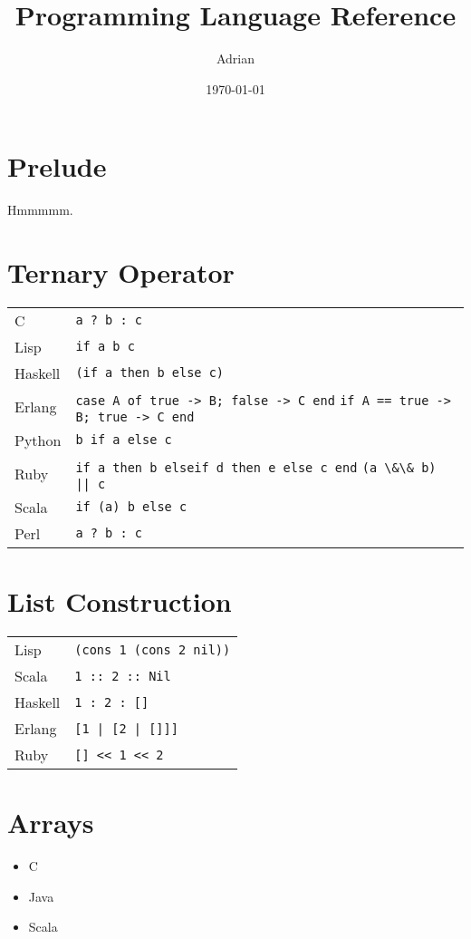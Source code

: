 \documentclass{article}
\begin{document}
\title{Programming Language Reference}
\author{Adrian}
\date{\today}
\maketitle

\section{Prelude}
Hmmmmm.

\section{Ternary Operator}
\begin{longtabu} to 0.75\linewidth { X X }
	C & \lstinline$a ? b : c$ \\
	Lisp & \lstinline$if a b c$ \\
	Haskell & \lstinline$(if a then b else c)$ \\
	Erlang & \lstinline$case A of true -> B; false -> C end$ \newline \lstinline$if A == true -> B; true -> C end$ \\
	Python & \lstinline$b if a else c$ \\
	Ruby & \lstinline$if a then b elseif d then e else c end$ \newline \lstinline$(a \&\& b) || c$ \\
	Scala & \lstinline$if (a) b else c$ \\
	Perl & \lstinline$a ? b : c$ \\
\end{longtabu}

\section{List Construction}
\begin{longtabu} to 0.75\linewidth { X X }
	Lisp & \lstinline$(cons 1 (cons 2 nil))$ \\
	Scala & \lstinline$1 :: 2 :: Nil$ \\
	Haskell & \lstinline$1 : 2 : []$ \\
	Erlang & \lstinline$[1 | [2 | []]]$ \\
	Ruby & \lstinline$[] << 1 << 2$ \\
\end{longtabu}

\section{Arrays}
\begin{itemize}
	\item C
	\item Java
	\item Scala
\end{itemize}
\end{document}
